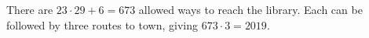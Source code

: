 There are $23\cdot29+6=673$ allowed ways to reach the library. Each can be followed by three routes to town, giving $673\cdot3=\boxed{2019}$.
